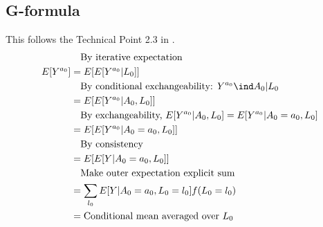 \documentclass[dvipdfmx,10pt]{article}
\begin{document}
\subsection{G-formula}
\label{sec:org068b635}
This follows the Technical Point 2.3 in \cite{hernanCausalInference2019}.
\begin{align*}
  &~~~\text{By iterative expectation}\\
  E[Y^{a_{0}}]
  &= E[E[Y^{a_{0}} | L_{0}]]\\
  &~~~\text{By conditional exchangeability: } Y^{a_{0}} \ind A_{0} | L_{0}\\
  &= E[E[Y^{a_{0}} | A_{0}, L_{0}]]\\
  &~~~\text{By exchangeability, }E[Y^{a_{0}} | A_{0}, L_{0}] = E[Y^{a_{0}} | A_{0} = a_{0}, L_{0}]\\
  &= E[E[Y^{a_{0}} | A_{0} = a_{0}, L_{0}]]\\
  &~~~\text{By consistency}\\
  &= E[E[Y | A_{0} = a_{0}, L_{0}]]\\
  &~~~\text{Make outer expectation explicit sum}\\
  &= \sum_{l_{0}} E[Y | A_{0} = a_{0}, L_{0} = l_{0}] f(L_{0} = l_{0})\\
  &= \text{Conditional mean averaged over $L_{0}$}\\
\end{align*}
\end{document}
